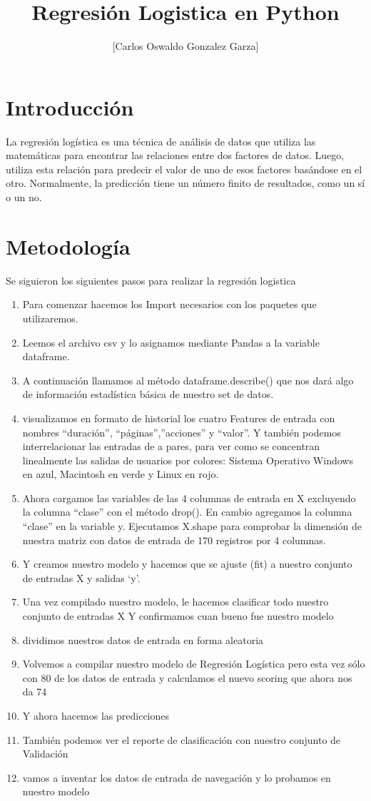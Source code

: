 \documentclass{article}
\title{Regresi\'on Logistica en Python}
\author{[Carlos Oswaldo Gonzalez Garza]}
\begin{document}
\maketitle

\section{Introducci\'on}
La regresión logística es una técnica de análisis de datos que utiliza las matemáticas para encontrar las relaciones entre dos factores de datos. Luego, utiliza esta relación para predecir el valor 
de uno de esos factores basándose en el otro. Normalmente, la predicción tiene un número finito de resultados, como un sí o un no.

\section{Metodolog\'ia}
Se siguieron los siguientes pasos para realizar la regresi\'on logistica
\begin{enumerate}
    \item Para comenzar hacemos los Import necesarios con los paquetes que utilizaremos.
    \item Leemos el archivo csv y lo asignamos mediante Pandas a la variable dataframe.
    \item A continuación llamamos al método dataframe.describe() que nos dará algo de información estadística básica de nuestro set de datos.
    \item visualizamos en formato de historial los cuatro Features de
    entrada con nombres “duración”, “páginas”,”acciones” y “valor”. Y también podemos interrelacionar las entradas de a pares, para ver como se concentran linealmente
    las salidas de usuarios por colores: Sistema Operativo Windows en azul, Macintosh en verde y Linux en rojo.
    \item Ahora cargamos las variables de las 4 columnas de entrada en X excluyendo la columna “clase” con
    el método drop(). En cambio agregamos la columna “clase” en la variable y. Ejecutamos X.shape para
    comprobar la dimensión de nuestra matriz con datos de entrada de 170 registros por 4 columnas.
    \item Y creamos nuestro modelo y hacemos que se ajuste (fit) a nuestro conjunto de entradas X y salidas ‘y’.
    \item Una vez compilado nuestro modelo, le hacemos clasificar todo nuestro conjunto de entradas X Y confirmamos cuan bueno fue nuestro modelo
    \item dividimos nuestros datos de entrada en forma aleatoria 
    \item Volvemos a compilar nuestro modelo de Regresión Logística pero esta vez sólo con 80 de los datos de entrada y calculamos el nuevo scoring que ahora nos da 74
    \item Y ahora hacemos las predicciones
    \item También podemos ver el reporte de clasificación con nuestro conjunto de Validación
    \item vamos a inventar los datos de entrada de navegación y lo probamos en nuestro modelo
\end{enumerate}
\end{document}
